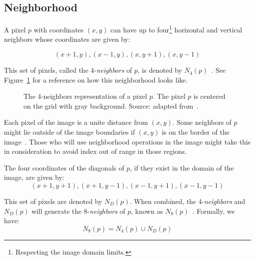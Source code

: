 \subsection{Neighborhood}
\label{sec:neighborhood}
A pixel $p$ with coordinates $(x, y)$ can have up to four\footnote{Respecting the image domain limits.} horizontal and vertical neighbors whose coordinates are given by:

\begin{equation*}
    (x + 1, y), (x - 1, y), (x, y + 1), (x, y - 1)
    \label{eq:n4_neighbors}
\end{equation*}

This set of pixels, called the 4-\textit{neighbors} of $p$, is denoted by $N_4(p)$~\citep{gonzalez:02}. See Figure~\ref{fig:n4-neighbors} for a reference on how this neighborhood looks like.

\begin{figure}[ht]
    \centering

    \caption[The 4-\textit{neighbors} representation of a pixel $p$]{The 4-neighbors representation of a pixel $p$. The pixel $p$ is centered on the grid with gray background. Source: adapted from~\citet{pedrini:08}.}
    \label{fig:n4-neighbors}
\end{figure}

Each pixel of the image is a unite distance from $(x, y)$. Some neighbors of $p$ might lie outside of the image boundaries if $(x, y)$ is on the border of the image~\citep{gonzalez:02}. Those who will use neighborhood operations in the image might take this in consideration to avoid index out of range in those regions.

The four coordinates of the diagonals of $p$, if they exist in the domain of the image, are given by:
\begin{equation*}
    (x + 1, y + 1), (x + 1, y - 1), (x - 1, y + 1), (x - 1, y - 1)
    \label{eq:nd_neighbors}
\end{equation*}

This set of pixels are denoted by $N_D(p)$. When combined, the 4-\textit{neighbors} and $N_D(p)$ will generate the 8-\textit{neighbors} of $p$, known as $N_8(p)$~\citep{gonzalez:02}. Formally, we have:
\begin{equation*}
    N_8(p) = N_4(p) \cup N_D(p)
    \label{eq:n8_neighbors}
\end{equation*}

